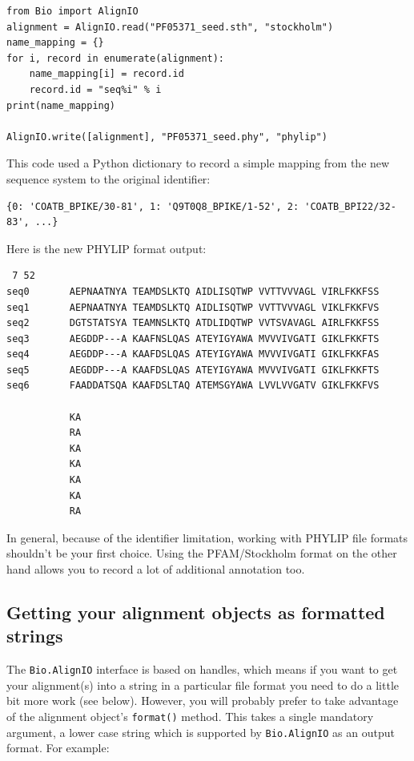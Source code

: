 \documentclass{report}
\begin{document}
\begin{verbatim}
from Bio import AlignIO
alignment = AlignIO.read("PF05371_seed.sth", "stockholm")
name_mapping = {}
for i, record in enumerate(alignment):
    name_mapping[i] = record.id
    record.id = "seq%i" % i
print(name_mapping)

AlignIO.write([alignment], "PF05371_seed.phy", "phylip")
\end{verbatim}

\noindent This code used a Python dictionary to record a simple mapping from the new sequence system to the original identifier:
\begin{verbatim}
{0: 'COATB_BPIKE/30-81', 1: 'Q9T0Q8_BPIKE/1-52', 2: 'COATB_BPI22/32-83', ...}
\end{verbatim}

\noindent Here is the new PHYLIP format output:
\begin{verbatim}
 7 52
seq0       AEPNAATNYA TEAMDSLKTQ AIDLISQTWP VVTTVVVAGL VIRLFKKFSS
seq1       AEPNAATNYA TEAMDSLKTQ AIDLISQTWP VVTTVVVAGL VIKLFKKFVS
seq2       DGTSTATSYA TEAMNSLKTQ ATDLIDQTWP VVTSVAVAGL AIRLFKKFSS
seq3       AEGDDP---A KAAFNSLQAS ATEYIGYAWA MVVVIVGATI GIKLFKKFTS
seq4       AEGDDP---A KAAFDSLQAS ATEYIGYAWA MVVVIVGATI GIKLFKKFAS
seq5       AEGDDP---A KAAFDSLQAS ATEYIGYAWA MVVVIVGATI GIKLFKKFTS
seq6       FAADDATSQA KAAFDSLTAQ ATEMSGYAWA LVVLVVGATV GIKLFKKFVS

           KA
           RA
           KA
           KA
           KA
           KA
           RA
\end{verbatim}

\noindent In general, because of the identifier limitation, working with PHYLIP file formats shouldn't be your first choice.  Using the PFAM/Stockholm format on the other hand allows you to record a lot of additional annotation too.

\subsection{Getting your alignment objects as formatted strings}
\label{sec:alignment-format-method}
The \verb|Bio.AlignIO| interface is based on handles, which means if you want to get your alignment(s) into a string in a particular file format you need to do a little bit more work (see below).  
However, you will probably prefer to take advantage of the alignment object's \verb|format()| method.
This takes a single mandatory argument, a lower case string which is supported by \verb|Bio.AlignIO| as an output format.  For example:
\end{document}
